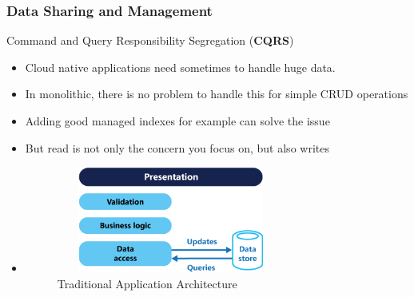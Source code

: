 \documentclass{beamer}
\begin{document}
	\begin{frame}
		\frametitle{Data Sharing and Management}
		Command and Query Responsibility Segregation (\textbf{CQRS})  
		\begin{itemize}
			\item<1->[] \small{Cloud native applications need sometimes to handle huge data.}
			\vspace{1mm}
			\item<2-> \scriptsize{In monolithic, there is no problem to handle this for simple CRUD operations}
			\item<3-> \scriptsize{Adding good managed indexes for example can solve the issue}
			\item<4-> \scriptsize{But read is not only the concern you focus on, but also writes}
			\item<2->[]
				\begin{figure}[h]
					\includegraphics[width=75mm,height= 35mm, scale=1]{img/tradition-crud.png}
					\caption{Traditional Application Architecture}
				\end{figure}
		\end{itemize}
	\end{frame}
\end{document}
